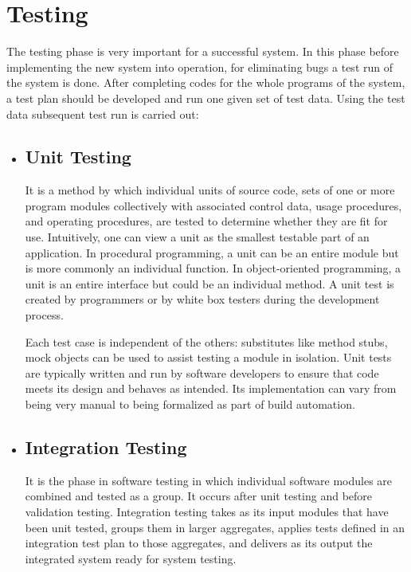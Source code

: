 		\section{Testing}
		\vs
		The testing phase is very important for a successful system. In this phase before implementing the new system into operation, for eliminating bugs a test run of the system is done. After completing codes for the whole programs of the system, a test plan should be developed and run one given set of test data. 
		\vs
		Using the test data subsequent test run is carried out: 
		\vs
		\begin{itemize}
			\item \subsection{Unit Testing}
			It is a method by which individual units of source code, sets of one or more program modules collectively with associated control data, usage procedures, and operating procedures, are tested to determine whether they are fit for use. Intuitively, one can view a unit as the smallest testable part of an application. In procedural programming, a unit can be an entire module but is more commonly an individual function. In object-oriented programming, a unit is an entire interface but could be an individual method. A unit test is created by programmers or by white box testers during the development process. 
			
			\vs
			
			Each test case is independent of the others: substitutes like method stubs, mock objects can be used to assist testing a module in isolation. Unit tests are typically written and run by software developers to ensure that code meets its design and behaves as intended. Its implementation can vary from being very manual to being formalized as part of build automation. 
			
			\item \subsection{Integration Testing}
			It is the phase in software testing in which individual software modules are combined and tested as a group. It occurs after unit testing and before validation testing. Integration testing takes as its input modules that have been unit tested, groups them in larger aggregates, applies tests defined in an integration test plan to those aggregates, and delivers as its output the integrated system ready for system testing. 
			

\end{itemize}
